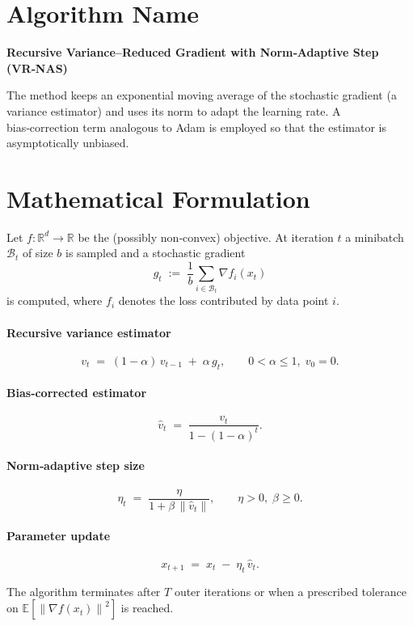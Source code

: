 \documentclass{article}
\newcommand{\E}{\mathbb{E}}
\newcommand{\norm}[1]{\left\|#1\right\|}
\newcommand{\grad}{\nabla}
\begin{document}
\section*{Algorithm Name}
\textbf{Recursive Variance–Reduced Gradient with Norm‑Adaptive Step (VR‑NAS)}  

The method keeps an exponential moving average of the stochastic gradient (a variance estimator) and uses its norm to adapt the learning rate.  A bias‑correction term analogous to Adam is employed so that the estimator is asymptotically unbiased.

\section*{Mathematical Formulation}
Let $f:\mathbb{R}^{d}\rightarrow\mathbb{R}$ be the (possibly non‑convex) objective.  
At iteration $t$ a minibatch $\mathcal{B}_{t}$ of size $b$ is sampled and a stochastic gradient
\[
g_{t}\;:=\;\frac{1}{b}\sum_{i\in\mathcal{B}_{t}}\grad f_{i}(x_{t}) 
\]
is computed, where $f_{i}$ denotes the loss contributed by data point $i$.  

\paragraph{Recursive variance estimator}
\[
v_{t}\;=\;(1-\alpha)\,v_{t-1}\;+\;\alpha\, g_{t},\qquad 0<\alpha\le 1,\; v_{0}=0.
\tag{1}
\]

\paragraph{Bias‑corrected estimator}
\[
\hat v_{t}\;=\;\frac{v_{t}}{1-(1-\alpha)^{t}} .
\tag{2}
\]

\paragraph{Norm‑adaptive step size}
\[
\eta_{t}\;=\;\frac{\eta}{1+\beta\,\norm{\hat v_{t}}},\qquad 
\eta>0,\;\beta\ge 0 .
\tag{3}
\]

\paragraph{Parameter update}
\[
x_{t+1}\;=\;x_{t}\;-\;\eta_{t}\,\hat v_{t}.
\tag{4}
\]

The algorithm terminates after $T$ outer iterations or when a prescribed tolerance on $\E\!\left[\norm{\grad f(x_{t})}^{2}\right]$ is reached.
\end{document}
